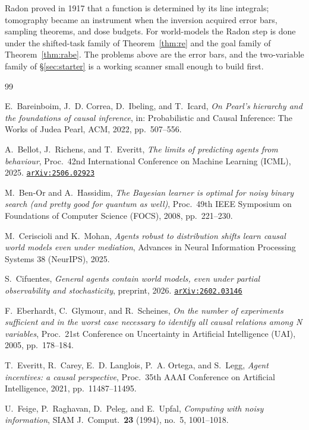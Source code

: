 \documentclass[11pt]{amsart}
\newcommand{\arxiv}[1]{\href{https://arxiv.org/abs/#1}{\texttt{arXiv:#1}}}
\theoremstyle{plain}
\theoremstyle{definition}
\begin{document}
\medskip
Radon proved in 1917 that a function is determined by its line integrals; tomography became an instrument when the inversion acquired error bars, sampling theorems, and dose budgets. For world-models the Radon step is done under the shifted-task family of Theorem~\ref{thm:re} and the goal family of Theorem~\ref{thm:rabe}. The problems above are the error bars, and the two-variable family of \S\ref{sec:starter} is a working scanner small enough to build first.

\begin{thebibliography}{99}

E.~Bareinboim, J.~D. Correa, D.~Ibeling, and T.~Icard,
\emph{On Pearl's hierarchy and the foundations of causal inference},
in: Probabilistic and Causal Inference: The Works of Judea Pearl, ACM, 2022, pp.~507--556.

A.~Bellot, J.~Richens, and T.~Everitt,
\emph{The limits of predicting agents from behaviour},
Proc.\ 42nd International Conference on Machine Learning (ICML), 2025. \arxiv{2506.02923}

M.~Ben-Or and A.~Hassidim,
\emph{The Bayesian learner is optimal for noisy binary search (and pretty good for quantum as well)},
Proc.\ 49th IEEE Symposium on Foundations of Computer Science (FOCS), 2008, pp.~221--230.

M.~Ceriscioli and K.~Mohan,
\emph{Agents robust to distribution shifts learn causal world models even under mediation},
Advances in Neural Information Processing Systems 38 (NeurIPS), 2025.

S.~Cifuentes,
\emph{General agents contain world models, even under partial observability and stochasticity},
preprint, 2026. \arxiv{2602.03146}

F.~Eberhardt, C.~Glymour, and R.~Scheines,
\emph{On the number of experiments sufficient and in the worst case necessary to identify all causal relations among N variables},
Proc.\ 21st Conference on Uncertainty in Artificial Intelligence (UAI), 2005, pp.~178--184.

T.~Everitt, R.~Carey, E.~D. Langlois, P.~A. Ortega, and S.~Legg,
\emph{Agent incentives: a causal perspective},
Proc.\ 35th AAAI Conference on Artificial Intelligence, 2021, pp.~11487--11495.

U.~Feige, P.~Raghavan, D.~Peleg, and E.~Upfal,
\emph{Computing with noisy information},
SIAM J.\ Comput.\ \textbf{23} (1994), no.~5, 1001--1018.


\end{thebibliography}
\end{document}
